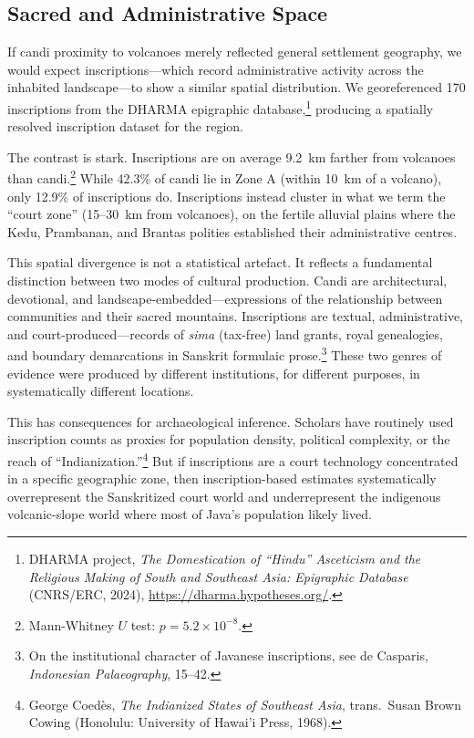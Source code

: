 \documentclass[12pt,a4paper]{article}
\begin{document}
\subsection{Sacred and Administrative Space}

If candi proximity to volcanoes merely reflected general settlement geography, we would expect inscriptions---which record administrative activity across the inhabited landscape---to show a similar spatial distribution.
We georeferenced 170 inscriptions from the DHARMA epigraphic database,\footnote{DHARMA project, \emph{The Domestication of ``Hindu'' Asceticism and the Religious Making of South and Southeast Asia: Epigraphic Database} (CNRS/ERC, 2024), \url{https://dharma.hypotheses.org/}.} producing a spatially resolved inscription dataset for the region.

The contrast is stark.
Inscriptions are on average 9.2~km farther from volcanoes than candi.\footnote{Mann-Whitney $U$ test: $p = 5.2 \times 10^{-8}$.}
While 42.3\% of candi lie in Zone A (within 10~km of a volcano), only 12.9\% of inscriptions do.
Inscriptions instead cluster in what we term the ``court zone'' (15--30~km from volcanoes), on the fertile alluvial plains where the Kedu, Prambanan, and Brantas polities established their administrative centres.

This spatial divergence is not a statistical artefact.
It reflects a fundamental distinction between two modes of cultural production.
Candi are architectural, devotional, and landscape-embedded---expressions of the relationship between communities and their sacred mountains.
Inscriptions are textual, administrative, and court-produced---records of \emph{sima} (tax-free) land grants, royal genealogies, and boundary demarcations in Sanskrit formulaic prose.\footnote{On the institutional character of Javanese inscriptions, see de Casparis, \emph{Indonesian Palaeography}, 15--42.}
These two genres of evidence were produced by different institutions, for different purposes, in systematically different locations.

This has consequences for archaeological inference.
Scholars have routinely used inscription counts as proxies for population density, political complexity, or the reach of ``Indianization.''\footnote{George Coed\`{e}s, \emph{The Indianized States of Southeast Asia}, trans.\ Susan Brown Cowing (Honolulu: University of Hawai'i Press, 1968).}
But if inscriptions are a court technology concentrated in a specific geographic zone, then inscription-based estimates systematically overrepresent the Sanskritized court world and underrepresent the indigenous volcanic-slope world where most of Java's population likely lived.
\end{document}
